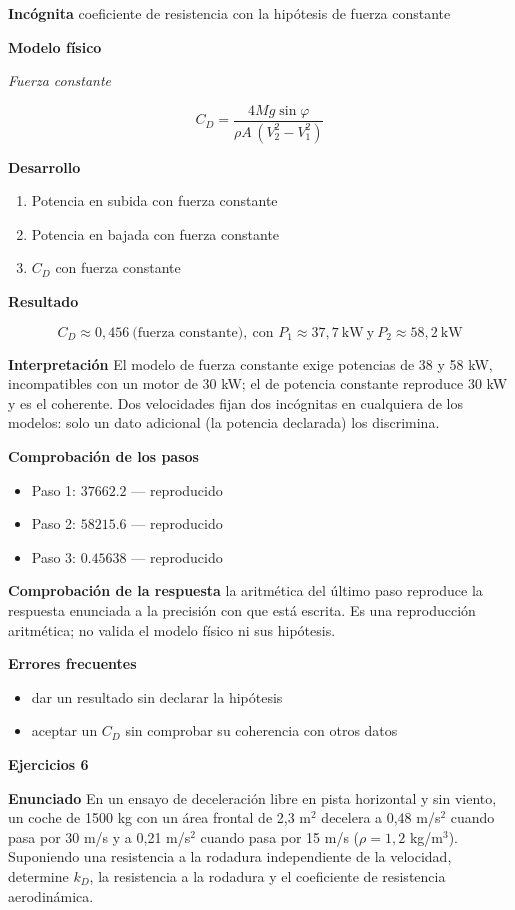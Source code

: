 \documentclass[10pt,openany]{book}
\begin{document}
\noindent\textbf{Incógnita}
coeficiente de resistencia con la hipótesis de fuerza constante

\noindent\textbf{Modelo físico}

\noindent\textit{Fuerza constante}

\[
C_D = \frac{4Mg\sin\varphi}{\rho A\,(V_2^{2} - V_1^{2})}
\]

\noindent\textbf{Desarrollo}
\begin{enumerate}
\item
Potencia en subida con fuerza constante
\item
Potencia en bajada con fuerza constante
\item
\(C_D\) con fuerza constante
\end{enumerate}

\noindent\textbf{Resultado}

\[
C_D \approx 0{,}456\ \text{(fuerza constante)},\ \text{con } P_1 \approx 37{,}7\ \mathrm{kW}\ \text{y}\ P_2 \approx 58{,}2\ \mathrm{kW}
\]

\noindent\textbf{Interpretación}
El modelo de fuerza constante exige potencias de 38 y 58 kW, incompatibles con un motor de 30 kW; el de potencia constante reproduce 30 kW y es el coherente. Dos velocidades fijan dos incógnitas en cualquiera de los modelos: solo un dato adicional (la potencia declarada) los discrimina.

\noindent\textbf{Comprobación de los pasos}
\begin{itemize}
\item Paso 1: $37662.2$ — reproducido
\item Paso 2: $58215.6$ — reproducido
\item Paso 3: $0.45638$ — reproducido
\end{itemize}

\noindent\textbf{Comprobación de la respuesta} la aritmética del último paso reproduce la respuesta enunciada a la precisión con que está escrita. Es una reproducción aritmética; no valida el modelo físico ni sus hipótesis.

\noindent\textbf{Errores frecuentes}
\begin{itemize}
\item dar un resultado sin declarar la hipótesis
\item aceptar un \(C_D\) sin comprobar su coherencia con otros datos
\end{itemize}

\noindent\textbf{Ejercicios 6}

\noindent\textbf{Enunciado}
En un ensayo de deceleración libre en pista horizontal y sin viento, un coche de 1500 kg con un área frontal de 2,3 m\(^2\) decelera a 0,48 m/s\(^2\) cuando pasa por 30 m/s y a 0,21 m/s\(^2\) cuando pasa por 15 m/s (\(\rho = 1{,}2\) kg/m\(^3\)). Suponiendo una resistencia a la rodadura independiente de la velocidad, determine \(k_D\), la resistencia a la rodadura y el coeficiente de resistencia aerodinámica.
\end{document}
